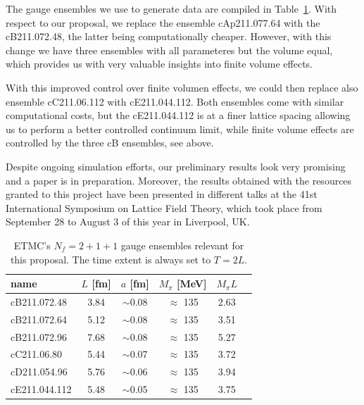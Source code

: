 \documentclass [a4paper, 11pt]{article}
\begin{document}
The gauge ensembles we use to generate data are compiled in Table~\ref{tab:ensembles}.
With respect to our proposal, we replace the ensemble cAp211.077.64
with the cB211.072.48, the latter being computationally
cheaper. However, with this change we have three ensembles with all
parameteres but the volume equal, which provides us with very valuable
insights into finite volume effects.

With this improved control over finite volumen effects, we could then
replace also ensemble cC211.06.112 with cE211.044.112. Both 
ensembles come with similar computational costs, but the cE211.044.112
is at a finer lattice spacing allowing us to perform a better
controlled continuum limit, while finite volume effects are controlled
by the three cB ensembles, see above.

Despite ongoing simulation efforts, our preliminary results
look very promising and a paper is in preparation.  
Moreover, the results obtained with the resources granted to this
project have been presented in different talks at the 41st
International Symposium on Lattice Field Theory, which took place from
September 28 to August 3 of this year in Liverpool, UK.


\begin{table}[h]
  \centering %
  \begin{tabular}{lccccr} %
    \hline
    name          & $L$ [fm]      & $a$
    [fm]          & $M_\pi$ [MeV] & $M_\pi L$                         \\
    \hline
    \hline
    cB211.072.48  & 3.84          & $\sim$0.08 & $\approx$ 135 & 2.63 \\
    cB211.072.64  & 5.12          & $\sim$0.08 & $\approx$ 135 & 3.51 \\
    cB211.072.96  & 7.68          & $\sim$0.08 & $\approx$ 135 & 5.27 \\
    \hline
    cC211.06.80   & 5.44          & $\sim$0.07 & $\approx$ 135 & 3.72 \\
    \hline
    cD211.054.96  & 5.76          & $\sim$0.06 & $\approx$ 135 & 3.94 \\
    \hline
    cE211.044.112 & 5.48          & $\sim$0.05 & $\approx$ 135 & 3.75 \\
    \hline
  \end{tabular}
  \caption{ETMC's $N_f=2+1+1$ gauge ensembles relevant for this
    proposal. The time extent is always set to $T=2L$.}
  \label{tab:ensembles}
\end{table}
\end{document}

